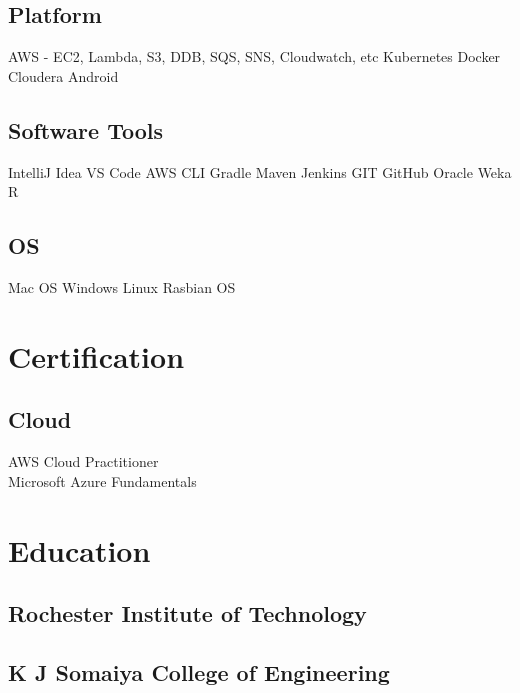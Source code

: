 \documentclass[]{main}
\begin{document}
\begin{minipage}[t]{0.25\textwidth}
\subsection{Platform}\sectionsep
                    AWS - EC2, Lambda, S3, DDB, SQS, SNS, Cloudwatch, etc
    \textbullet{}   Kubernetes
    \textbullet{}   Docker
    \textbullet{}   Cloudera
    \textbullet{}   Android
\sectionsep\sectionsep
\subsection{Software Tools}\sectionsep
                    IntelliJ Idea  
    \textbullet{}   VS Code 
    \textbullet{}   AWS CLI
    \textbullet{}   Gradle 
    \textbullet{}   Maven  
    \textbullet{}   Jenkins  
    \textbullet{}   GIT 
    \textbullet{}   GitHub  
    \textbullet{}   Oracle  
    \textbullet{}   Weka 
    \textbullet{}   R
\sectionsep\sectionsep
\subsection{OS}\sectionsep
                    Mac OS  
    \textbullet{}   Windows 
    \textbullet{}   Linux  
    \textbullet{}   Rasbian OS
\sectionsep\sectionsep

\section{Certification}

\subsection{Cloud}
\sectionsep
AWS Cloud Practitioner\\
Microsoft Azure Fundamentals\\
\sectionsep

\section{Education} 
\subsection{Rochester Institute of Technology}
\sectionsep
{}
\sectionsep\sectionsep

\subsection{K J Somaiya College of Engineering}
\sectionsep
{}
\sectionsep\sectionsep

%
%

\end{minipage} 
\end{document}
